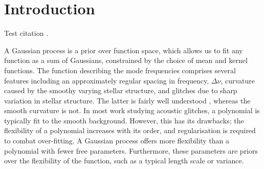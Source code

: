 \documentclass[linenumbers,modern]{aastex631}
\begin{document}

\section{Introduction} \label{sec:intro}

Test citation \citep{Lund:2017}.

A Gaussian process is a prior over function space, which allows us to fit any
function as a sum of Gaussians, constrained by the choice of mean and kernel
functions. The function describing the mode frequencies comprises several
features including an approximately regular spacing in frequency,
\(\Delta\nu\), curvature caused by the smoothy varying stellar structure, and
glitches due to sharp variation in stellar structure. The latter is fairly well
understood \citep{Houdek:2007}, whereas the smooth curvature is not. In
most work studying acoustic glitches, a polynomial is typically fit
to the smooth background. However, this has its drawbacks; the flexibility
of a polynomial increases with its order, and regularisation is required to
combat over-fitting. A Gaussian process offers more flexibility than a
polynomial with fewer free parameters. Furthermore, these parameters are priors
over the flexibility of the function, such as a typical length scale or
variance.
\end{document}
